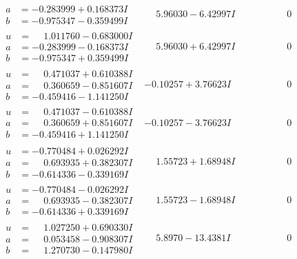 \documentclass[1p]{elsarticle_modified}
\theoremstyle{definition}
\begin{document}
$$\begin{array}{c|c|c}
\begin{aligned}
a &= -0.283999 + 0.168373 I \\
b &= -0.975347 - 0.359499 I\end{aligned}
 & \phantom{-}5.96030 - 6.42997 I & \phantom{-0.000000 } 0 \\ \hline\begin{aligned}
u &= \phantom{-}1.011760 - 0.683000 I \\
a &= -0.283999 - 0.168373 I \\
b &= -0.975347 + 0.359499 I\end{aligned}
 & \phantom{-}5.96030 + 6.42997 I & \phantom{-0.000000 } 0 \\ \hline\begin{aligned}
u &= \phantom{-}0.471037 + 0.610388 I \\
a &= \phantom{-}0.360659 - 0.851607 I \\
b &= -0.459416 - 1.141250 I\end{aligned}
 & -0.10257 + 3.76623 I & \phantom{-0.000000 } 0 \\ \hline\begin{aligned}
u &= \phantom{-}0.471037 - 0.610388 I \\
a &= \phantom{-}0.360659 + 0.851607 I \\
b &= -0.459416 + 1.141250 I\end{aligned}
 & -0.10257 - 3.76623 I & \phantom{-0.000000 } 0 \\ \hline\begin{aligned}
u &= -0.770484 + 0.026292 I \\
a &= \phantom{-}0.693935 + 0.382307 I \\
b &= -0.614336 - 0.339169 I\end{aligned}
 & \phantom{-}1.55723 + 1.68948 I & \phantom{-0.000000 } 0 \\ \hline\begin{aligned}
u &= -0.770484 - 0.026292 I \\
a &= \phantom{-}0.693935 - 0.382307 I \\
b &= -0.614336 + 0.339169 I\end{aligned}
 & \phantom{-}1.55723 - 1.68948 I & \phantom{-0.000000 } 0 \\ \hline\begin{aligned}
u &= \phantom{-}1.027250 + 0.690330 I \\
a &= \phantom{-}0.053458 - 0.908307 I \\
b &= \phantom{-}1.270730 - 0.147980 I\end{aligned}
 & \phantom{-}5.8970 - 13.4381 I & \phantom{-0.000000 } 0 \\ \hline\begin{aligned}

\end{aligned}
\end{array}$$
\end{document}
